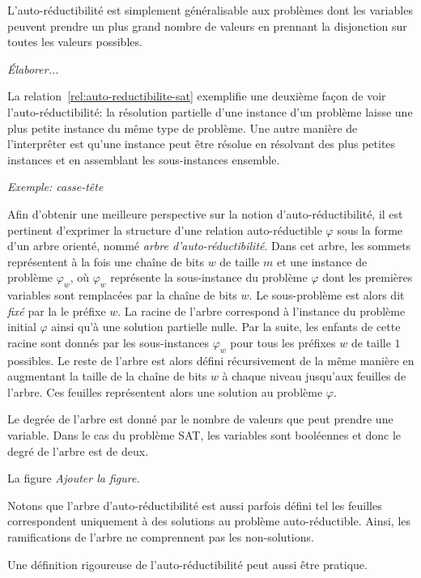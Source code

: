 L'auto-réductibilité est simplement généralisable aux problèmes dont les variables peuvent prendre un plus grand nombre de valeurs en prennant la disjonction sur toutes les valeurs possibles.

\textcolor{mydarkred}{\textit{Élaborer...}}

La relation~\ref{rel:auto-reductibilite-sat} exemplifie une deuxième façon de voir l'auto-réductibilité: la résolution partielle d'une instance d'un problème laisse une plus petite instance du même type de problème. Une autre manière de l'interprêter est qu'une instance peut être résolue en résolvant des plus petites instances et en assemblant les sous-instances ensemble.

\textcolor{mydarkred}{\textit{Exemple: casse-tête}}

Afin d'obtenir une meilleure perspective sur la notion d'auto-réductibilité, il est pertinent d'exprimer la structure d'une relation auto-réductible $\varphi$ sous la forme d'un arbre orienté, nommé \textit{arbre d'auto-réductibilité}. Dans cet arbre, les sommets représentent à la fois une chaîne de bits $w$ de taille $m$ et une instance de problème $\varphi_{w}$, où $\varphi_{w}$ représente la sous-instance du problème $\varphi$ dont les premières variables sont remplacées par la chaîne de bits $w$. Le sous-problème est alors dit \textit{fixé} par la le préfixe $w$. La racine de l'arbre correspond à l'instance du problème initial $\varphi$ ainsi qu'à une solution partielle nulle. Par la suite, les enfants de cette racine sont donnés par les sous-instances $\varphi_{w}$ pour tous les préfixes $w$ de taille $1$ possibles. Le reste de l'arbre est alors défini récursivement de la même manière en augmentant la taille de la chaîne de bits $w$ à chaque niveau jusqu'aux feuilles de l'arbre. Ces feuilles représentent alors une solution au problème $\varphi$.

Le degrée de l'arbre est donné par le nombre de valeurs que peut prendre une variable. Dans le cas du problème SAT, les variables sont booléennes et donc le degré de l'arbre est de deux.

La figure \textcolor{mydarkred}{\textit{Ajouter la figure.}}

Notons que l'arbre d'auto-réductibilité est aussi parfois défini tel les feuilles correspondent uniquement à des solutions au problème auto-réductible. Ainsi, les ramifications de l'arbre ne comprennent pas les non-solutions.

Une définition rigoureuse de l'auto-réductibilité peut aussi être pratique.

